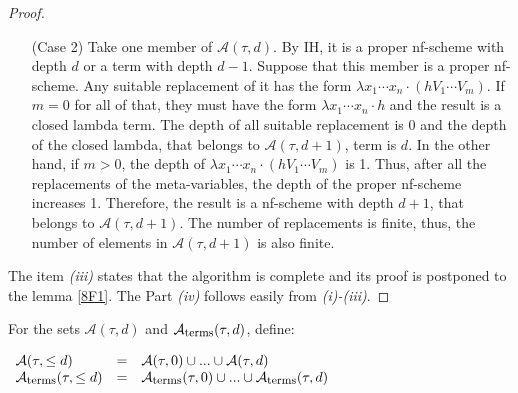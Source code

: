 \documentclass[a4paper,10pt]{article}
\begin{document}
\begin{proof}
\begin{itemize}
               \item[(Case 2)] Take one member of
                 $\mathcal{A}(\tau,d)$. By IH, it is a proper
                 nf-scheme with depth $d$ or a term with depth
                 $d-1$. Suppose that this member is a proper
                 nf-scheme. Any suitable replacement of it has the form $\lambda
                 x_1 \cdots x_n \cdot(h V_1 \cdots V_m)$. If $m=0$ for
                 all of that, they must have the form $\lambda
                 x_1 \cdots x_n \cdot h$ and the result is a closed
                 lambda term. The depth of all suitable replacement
                 is $0$ and the depth of the closed lambda, that belongs to $\mathcal{A}(\tau,d+1)$, term is
                 $d$. In the other hand, if $m > 0$, the depth of $\lambda
                 x_1 \cdots x_n \cdot(h V_1 \cdots V_m)$ is 1. Thus, after all the replacements of the meta-variables, the depth of the proper nf-scheme increases 1. Therefore, the result is a nf-scheme with depth $d+1$, that belongs to $\mathcal{A}(\tau,d+1)$. The number of replacements is finite, thus, the number of elements in $\mathcal{A}(\tau,d+1)$ is also finite.
                 
    \end{itemize}

    The item {\em (iii)} states that the algorithm is complete and its proof is postponed to the lemma \ref{8F1}. The Part {\em (iv)} follows easily from {\em (i)-(iii)}.
\end{proof}


\begin{mydef}\label{8D1}
For the sets $\mathcal{A}(\tau,d)$ and $\mathcal{A}_{\mbox{\footnotesize terms}}(\tau,d)$, define:
 \begin{center}
 $\begin{array}{lcl}
   \mathcal{A}(\tau,\leq d) & = &  \mathcal{A}(\tau,0) \cup ... \cup \mathcal{A}(\tau,d) \\
   \mathcal{A}_{\mbox{\footnotesize terms}}(\tau,\leq d) & = &  \mathcal{A}_{\mbox{\footnotesize terms}}(\tau,0) \cup ... \cup \mathcal{A}_{\mbox{\footnotesize terms}}(\tau,d)
  \end{array}$
  \end{center}
\end{mydef}


% 
\end{document}
